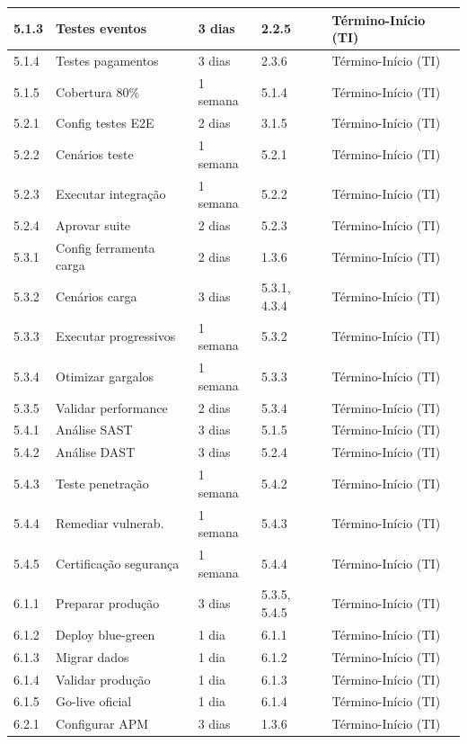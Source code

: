 \begin{table}[H]
\begin{tabular}{|p{1cm}|p{5cm}|p{2cm}|p{1.5cm}|p{3cm}|}
5.1.3 & Testes eventos & 3 dias & 2.2.5 & Término-Início (TI) \\ \hline
5.1.4 & Testes pagamentos & 3 dias & 2.3.6 & Término-Início (TI) \\ \hline
5.1.5 & Cobertura 80\% & 1 semana & 5.1.4 & Término-Início (TI) \\ \hline
5.2.1 & Config testes E2E & 2 dias & 3.1.5 & Término-Início (TI) \\ \hline
5.2.2 & Cenários teste & 1 semana & 5.2.1 & Término-Início (TI) \\ \hline
5.2.3 & Executar integração & 1 semana & 5.2.2 & Término-Início (TI) \\ \hline
5.2.4 & Aprovar suite & 2 dias & 5.2.3 & Término-Início (TI) \\ \hline
5.3.1 & Config ferramenta carga & 2 dias & 1.3.6 & Término-Início (TI) \\ \hline
5.3.2 & Cenários carga & 3 dias & 5.3.1, 4.3.4 & Término-Início (TI) \\ \hline
5.3.3 & Executar progressivos & 1 semana & 5.3.2 & Término-Início (TI) \\ \hline
5.3.4 & Otimizar gargalos & 1 semana & 5.3.3 & Término-Início (TI) \\ \hline
5.3.5 & Validar performance & 2 dias & 5.3.4 & Término-Início (TI) \\ \hline
5.4.1 & Análise SAST & 3 dias & 5.1.5 & Término-Início (TI) \\ \hline
5.4.2 & Análise DAST & 3 dias & 5.2.4 & Término-Início (TI) \\ \hline
5.4.3 & Teste penetração & 1 semana & 5.4.2 & Término-Início (TI) \\ \hline
5.4.4 & Remediar vulnerab. & 1 semana & 5.4.3 & Término-Início (TI) \\ \hline
5.4.5 & Certificação segurança & 1 semana & 5.4.4 & Término-Início (TI) \\ \hline
6.1.1 & Preparar produção & 3 dias & 5.3.5, 5.4.5 & Término-Início (TI) \\ \hline
6.1.2 & Deploy blue-green & 1 dia & 6.1.1 & Término-Início (TI) \\ \hline
6.1.3 & Migrar dados & 1 dia & 6.1.2 & Término-Início (TI) \\ \hline
6.1.4 & Validar produção & 1 dia & 6.1.3 & Término-Início (TI) \\ \hline
6.1.5 & Go-live oficial & 1 dia & 6.1.4 & Término-Início (TI) \\ \hline
6.2.1 & Configurar APM & 3 dias & 1.3.6 & Término-Início (TI) \\ \hline

\end{tabular}
\end{table}
